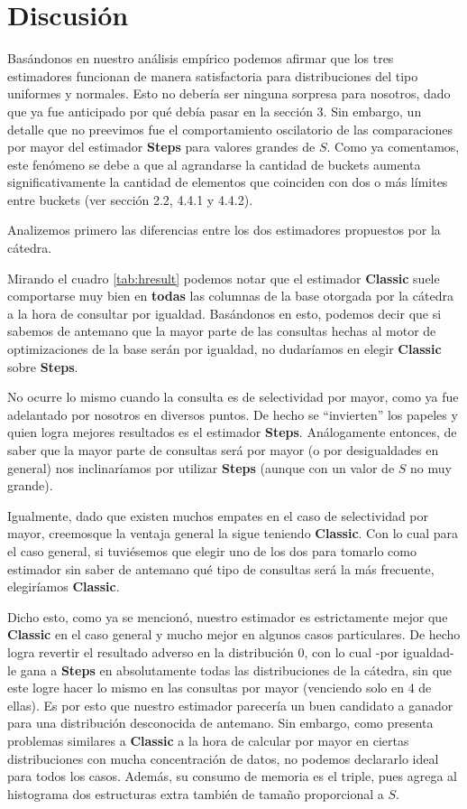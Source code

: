 \section{Discusión}
Basándonos en nuestro análisis empírico podemos afirmar que los tres estimadores funcionan de manera satisfactoria para distribuciones del tipo uniformes y normales. Esto no debería ser ninguna sorpresa para nosotros, dado que ya fue anticipado por qué debía pasar en la sección 3. Sin embargo, un detalle que no preevimos fue el comportamiento oscilatorio de las comparaciones por mayor del estimador \textbf{Steps} para valores grandes de $S$. Como ya comentamos, este fenómeno se debe a que al agrandarse la cantidad de buckets aumenta significativamente la cantidad de elementos que coinciden con dos o más límites entre buckets (ver sección 2.2, 4.4.1 y 4.4.2).

Analizemos primero las diferencias entre los dos estimadores propuestos por la cátedra.

Mirando el cuadro \ref{tab:hresult} podemos notar que el estimador \textbf{Classic} suele comportarse muy bien en \textbf{todas} las columnas de la base otorgada por la cátedra a la hora de consultar por igualdad. Basándonos en esto, podemos decir que si sabemos de antemano que la mayor parte de las consultas hechas al motor de optimizaciones de la base serán por igualdad, no dudaríamos en elegir \textbf{Classic} sobre \textbf{Steps}.

No ocurre lo mismo cuando la consulta es de selectividad por mayor, como ya fue adelantado por nosotros en diversos puntos. De hecho se ``invierten'' los papeles y quien logra mejores resultados es el estimador \textbf{Steps}. Análogamente entonces, de saber que la mayor parte de consultas será por mayor (o por desigualdades en general) nos inclinaríamos por utilizar \textbf{Steps} (aunque con un valor de $S$ no muy grande).

Igualmente, dado que existen muchos empates en el caso de selectividad por mayor,  creemosque la ventaja general la sigue teniendo \textbf{Classic}. Con lo cual para el caso general, si tuviésemos que elegir uno de los dos para tomarlo como estimador sin saber de antemano qué tipo de consultas será la más frecuente, elegiríamos \textbf{Classic}.

Dicho esto, como ya se mencionó, nuestro estimador es estrictamente mejor que \textbf{Classic} en el caso general y mucho mejor en algunos casos particulares. De hecho logra revertir el resultado adverso en la distribución 0, con lo cual -por igualdad- le gana a \textbf{Steps} en absolutamente todas las distribuciones de la cátedra, sin que este logre hacer lo mismo en las consultas por mayor (venciendo solo en 4 de ellas). Es por esto que nuestro estimador parecería un buen candidato a ganador para una distribución desconocida de antemano. Sin embargo, como presenta problemas similares a \textbf{Classic} a la hora de calcular por mayor en ciertas distribuciones con mucha concentración de datos, no podemos declararlo ideal para todos los casos. Además, su consumo de memoria es el triple, pues agrega al histograma dos estructuras extra también de tamaño proporcional a $S$.

